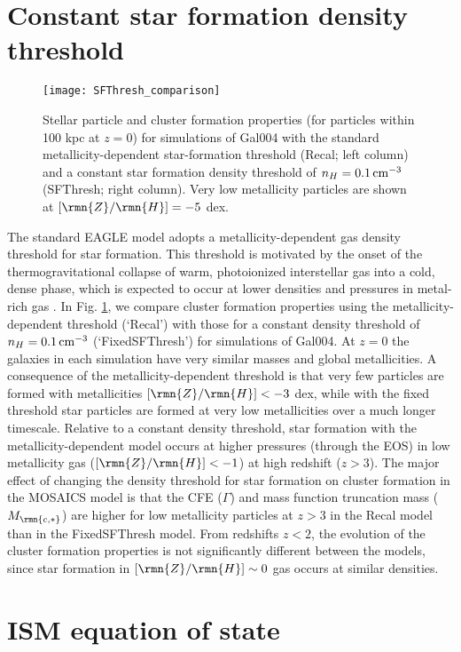 \documentclass[fleqn,usenatbib]{mnras}
\newcommand\ZH{\lbrack \rmn{Z}/\rmn{H} \rbrack}
\newcommand{\cmcubed}              {\,{\rm cm}^{-3}}
\newcommand{\Mcstar}{M_\rmn{c,\ast}}
\begin{document}
\section{Constant star formation density threshold} \label{app:SFThresh}

\begin{figure*}
  \texttt{[image: SFThresh\_comparison]}
  \caption{ Stellar particle and cluster formation properties (for particles within 100 kpc at $z=0$) for simulations of Gal004 with the standard metallicity-dependent star-formation threshold (Recal; left column) and a constant star formation density threshold of $n_H = 0.1 \cmcubed$ (SFThresh; right column). Very low metallicity particles are shown at $\ZH = -5$ dex. }
  \label{fig:SFThresh}
\end{figure*}


The standard EAGLE model adopts a metallicity-dependent gas density threshold for star formation. This threshold is motivated by the onset of the thermogravitational collapse of warm, photoionized interstellar gas into a cold, dense phase, which is expected to occur at lower densities and pressures in metal-rich gas \citep{Schaye_04}. 
In Fig. \ref{fig:SFThresh}, we compare cluster formation properties using the metallicity-dependent threshold (`Recal') with those for a constant density threshold of $n_H = 0.1 \cmcubed$ (`FixedSFThresh') for simulations of Gal004. At $z=0$ the galaxies in each simulation have very similar masses and global metallicities. A consequence of the metallicity-dependent threshold is that very few particles are formed with metallicities $\ZH < -3$ dex, while with the fixed threshold star particles are formed at very low metallicities over a much longer timescale.
Relative to a constant density threshold, star formation with the metallicity-dependent model occurs at higher pressures (through the EOS) in low metallicity gas ($\ZH < -1$) at high redshift ($z>3$). 
The major effect of changing the density threshold for star formation on cluster formation in the MOSAICS model is that the CFE ($\Gamma$) and mass function truncation mass ($\Mcstar$) are higher for low metallicity particles at $z>3$ in the Recal model than in the FixedSFThresh model.
From redshifts $z<2$, the evolution of the cluster formation properties is not significantly different between the models, since star formation in $\ZH \sim 0$ gas occurs at similar densities.


\section{ISM equation of state} \label{app:EOS}
\end{document}
